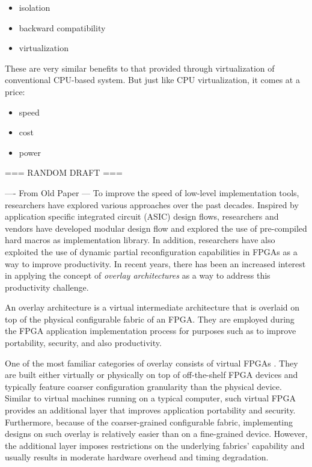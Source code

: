 \begin{itemize}
\item isolation
\item backward compatibility
\item virtualization
\end{itemize}

These are very similar benefits to that provided through virtualization of conventional CPU-based system.  But just like CPU virtualization, it comes at a price:

\begin{itemize}
\item speed
\item cost
\item power
\end{itemize}


=== RANDOM DRAFT ===


---- From Old Paper ---
To improve the speed of low-level implementation tools, researchers have explored various approaches over the past decades.
Inspired by application specific integrated circuit (ASIC) design flows, researchers and vendors have developed modular design flow and explored the use of pre-compiled hard macros \cite{lavin2010using,lavin2011} as implementation library.
In addition, researchers have also exploited the use of dynamic partial reconfiguration capabilities in FPGAs \cite{Frangieh2010} as a way to improve productivity.
In recent years, there has been an increased interest in applying the concept of \emph{overlay architectures} as a way to address this productivity challenge.  




An overlay architecture is a virtual intermediate architecture that is overlaid on top of the physical configurable fabric of an FPGA.  They are employed during the FPGA application implementation process for purposes such as to improve portability, security, and also productivity.


One of the most familiar categories of overlay consists of virtual FPGAs \cite{zuma2013carl,Grant2011Malibu,Coole2010Intermediate,Koch2013CI}. They are built either virtually or physically on top of off-the-shelf FPGA devices and typically feature coarser configuration granularity than the physical device.
Similar to virtual machines running on a typical computer, such virtual FPGA provides an additional layer that improves application portability and security.
Furthermore, because of the coarser-grained configurable fabric, implementing designs on such overlay is relatively easier than on a fine-grained device.
However, the additional layer imposes restrictions on the underlying fabrics' capability and usually results in moderate hardware overhead and timing degradation.


